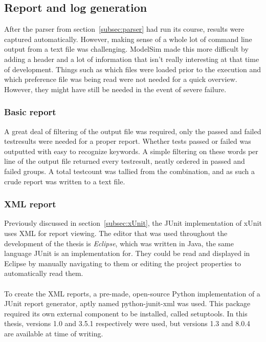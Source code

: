 \documentclass[11pt,british]{article}
\begin{document}
\subsection{Report and log generation}
\label{subsec:reports}
After the parser from section~\ref{subsec:parser} had run its course, results were captured automatically. However, making sense of a whole lot of command line output from a text file was challenging. ModelSim made this more difficult by adding a header and a lot of information that isn't really interesting at that time of development. Things such as which files were loaded prior to the execution and which preference file was being read were not needed for a quick overview. However, they might have still be needed in the event of severe failure.

\subsubsection{Basic report}
A great deal of filtering of the output file was required, only the passed and failed testresults were needed for a proper report. Whether tests passed or failed was outputted with easy to recognize keywords. A simple filtering on these words per line of the output file returned every testresult, neatly ordered in passed and failed groups. A total testcount was tallied from the combination, and as such a crude report was written to a text file.

\subsubsection{XML report}
Previously discussed in section~\ref{subsec:xUnit}, the JUnit implementation of xUnit uses \gls{XML} for report viewing. The editor that was used throughout the development of the thesis is \emph{Eclipse}, which was written in Java, the same language JUnit is an implementation for. They could be read and displayed in Eclipse by manually navigating to them or editing the project properties to automatically read them.
\\
\\
To create the XML reports, a pre-made, open-source Python implementation of a JUnit report generator, aptly named python-junit-xml was used. This package required its own external component to be installed, called setuptools.\cite{junitxml, setuptools} In this thesis, versions 1.0 and 3.5.1 respectively were used, but versions 1.3 and 8.0.4 are available at time of writing. 
\end{document}
